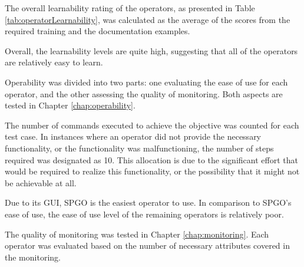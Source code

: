 

The overall learnability rating of the operators, as presented in Table \ref{tab:operatorLearnability}, was calculated as the average of the scores from the required training and the documentation examples.

Overall, the learnability levels are quite high, suggesting that all of the operators are relatively easy to learn.



\label{chap:testOperatbility}
Operability was divided into two parts: one evaluating the ease of use for each operator, and the other assessing the quality of monitoring. Both aspects are tested in Chapter \ref{chap:operability}.

The number of commands executed to achieve the objective was counted for each test case. In instances where an operator did not provide the necessary functionality, or the functionality was malfunctioning, the number of steps required was designated as 10.
This allocation is due to the significant effort that would be required to realize this functionality, or the possibility that it might not be achievable at all.

Due to its GUI, SPGO is the easiest operator to use. In comparison to SPGO's ease of use, the ease of use level of the remaining operators is relatively poor.




The quality of monitoring was tested in Chapter \ref{chap:monitoring}. Each operator was evaluated based on the number of necessary attributes covered in the monitoring.


